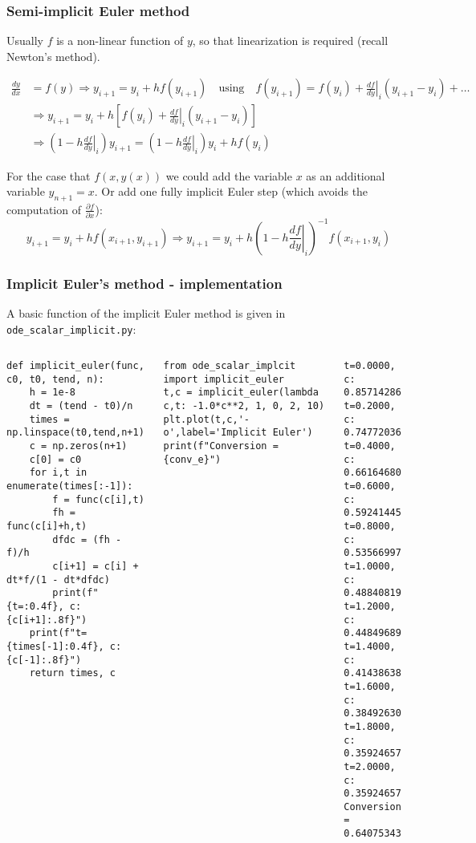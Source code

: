 \begin{frame}
  \frametitle{Semi-implicit Euler method}
  \footnotesize\selectfont
  Usually $f$ is a non-linear function of $y$, so that linearization is required (recall Newton's method).
  
  \begin{align*}
    \frac{dy}{dx} &= f(y) \Rightarrow y_{i+1} = y_i + h f (y_{i+1}) \quad \text{using} \quad f(y_{i+1}) = f(y_i) + \left.\frac{df}{dy}\right|_i(y_{i+1}-y_i) + \ldots \\
  &\Rightarrow y_{i+1} =  y_i + h \left[ f(y_i) + \left.\frac{df}{dy}\right|_i (y_{i+1}-y_i) \right] \\ 
  &\Rightarrow \left(1-h\left.\frac{df}{dy}\right|_i \right)y_{i+1} = \left(1-h\left.\frac{df}{dy}\right|_i\right)y_i + h f(y_i) 
  \end{align*}
  
  \pause
  For the case that $f(x,y(x))$ we could add the variable $x$ as an additional variable $y_{n+1}=x$. Or add one fully implicit Euler step (which avoids the computation of $\frac{\partial f}{\partial x}$): \vspace*{-1em}
  \[
    y_{i+1} = y_i + h f(x_{i+1},y_{i+1}) \Rightarrow y_{i+1} = y_i + h \left(1-h\left.\frac{df}{dy}\right|_i \right)^{-1} f(x_{i+1},y_i)
  \]
\end{frame}


\begin{frame}[fragile]
  \frametitle{Implicit Euler's method - implementation}
  A basic function of the implicit Euler method is given in \lstinline$ode_scalar_implicit.py$:
  \begin{columns}
      \begin{lstlisting}
def implicit_euler(func, c0, t0, tend, n):
    h = 1e-8
    dt = (tend - t0)/n
    times = np.linspace(t0,tend,n+1)
    c = np.zeros(n+1)
    c[0] = c0
    for i,t in enumerate(times[:-1]):
        f = func(c[i],t)
        fh = func(c[i]+h,t)
        dfdc = (fh - f)/h
        c[i+1] = c[i] + dt*f/(1 - dt*dfdc)
        print(f"{t=:0.4f}, c: {c[i+1]:.8f}")
    print(f"t={times[-1]:0.4f}, c: {c[-1]:.8f}")
    return times, c
  \end{lstlisting}
  \pause
      \begin{lstlisting}
from ode_scalar_implcit import implicit_euler
t,c = implicit_euler(lambda c,t: -1.0*c**2, 1, 0, 2, 10)
plt.plot(t,c,'-o',label='Implicit Euler')
print(f"Conversion = {conv_e}")
      \end{lstlisting}
    \pause
      \begin{lstlisting}[style=output]
t=0.0000, c: 0.85714286
t=0.2000, c: 0.74772036
t=0.4000, c: 0.66164680
t=0.6000, c: 0.59241445
t=0.8000, c: 0.53566997
t=1.0000, c: 0.48840819
t=1.2000, c: 0.44849689
t=1.4000, c: 0.41438638
t=1.6000, c: 0.38492630
t=1.8000, c: 0.35924657
t=2.0000, c: 0.35924657
Conversion = 0.64075343
      \end{lstlisting}
  \end{columns}
\end{frame}

